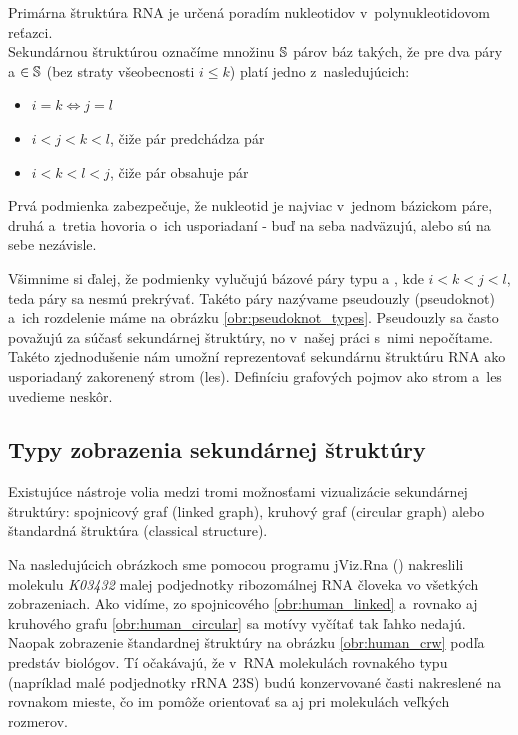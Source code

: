 \begin{definice}
  \label{def:RNA_sekundarna_struktura}
  Primárna štruktúra RNA je určená poradím nukleotidov v~polynukleotidovom reťazci.
  \\
  Sekundárnou štruktúrou označíme množinu $\mathbb{S}$ párov báz  takých,
  že pre dva páry  a  $\in \mathbb{S}$ (bez straty všeobecnosti $i \leq k$)
  platí jedno z~nasledujúcich:
  \begin{itemize}
    \item $i = k \iff j = l$
    \item $i < j < k < l$, čiže pár  predchádza pár 
    \item $i < k < l < j$, čiže pár  obsahuje pár 
  \end{itemize}
\end{definice}

Prvá podmienka zabezpečuje, že nukleotid je najviac v~jednom bázickom páre,
druhá a~tretia hovoria o~ich usporiadaní - buď na seba nadväzujú, alebo
sú na sebe nezávisle.

Všimnime si ďalej, že podmienky vylučujú bázové páry typu  a ,
kde \mbox{$i < k < j < l$}, teda páry sa nesmú prekrývať. Takéto páry nazývame
pseudouzly (pseudoknot) a~ich rozdelenie máme na obrázku \ref{obr:pseudoknot_types}.
Pseudouzly sa často považujú za súčasť sekundárnej štruktúry, no v~našej práci
s~nimi nepočítame. Takéto zjednodušenie nám umožní reprezentovať sekundárnu
štruktúru RNA ako usporiadaný zakorenený strom (les). Definíciu grafových
pojmov ako strom a~les uvedieme neskôr.





\subsection{Typy zobrazenia sekundárnej štruktúry}

Existujúce nástroje volia medzi tromi možnosťami vizualizácie sekundárnej
štruktúry: spojnicový graf (linked graph), kruhový graf (circular graph)
alebo štandardná štruktúra (classical structure).

Na nasledujúcich obrázkoch sme pomocou programu jViz.Rna (\citet{JVIZ})
nakreslili molekulu \textit{K03432} malej podjednotky ribozomálnej RNA človeka
vo všetkých zobrazeniach.
Ako vidíme, zo spojnicového \ref{obr:human_linked} a~rovnako aj kruhového
grafu \ref{obr:human_circular} sa motívy vyčítať tak ľahko nedajú.
Naopak zobrazenie štandardnej štruktúry na obrázku \ref{obr:human_crw}
podľa predstáv biológov.
Tí očakávajú, že v~RNA molekulách rovnakého typu (napríklad malé podjednotky rRNA 23S)
budú konzervované časti nakreslené na rovnakom mieste, čo im pomôže orientovať sa
aj pri molekulách veľkých rozmerov.


